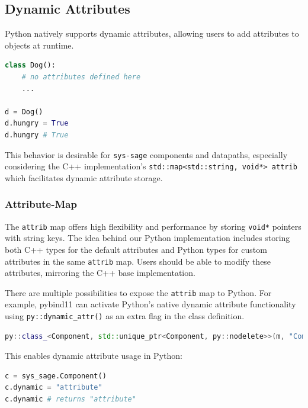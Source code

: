 \subsection{Dynamic Attributes}

Python natively supports dynamic attributes, allowing users to add attributes to objects at runtime.

\begin{lstlisting}[language=Python, xleftmargin=4em, frame = single]
class Dog():
    # no attributes defined here
    ...

d = Dog()
d.hungry = True
d.hungry # True
\end{lstlisting}

This behavior is desirable for \verb|sys-sage| components and datapaths, especially considering the C++ implementation's \verb|std::map<std::string, void*> attrib| which facilitates dynamic attribute storage.

\subsubsection{Attribute-Map}

The \verb|attrib| map offers high flexibility and performance by storing \verb|void*| pointers with string keys. The idea behind our Python implementation includes storing both C++ types for the default attributes and Python types for custom attributes in the same \verb|attrib| map. Users should be able to modify these attributes, mirroring the C++ base implementation.

There are multiple possibilities to expose the \verb|attrib| map to Python. For example, pybind11 can activate Python's native dynamic attribute functionality using \verb|py::dynamic_attr()| as an extra flag in the class definition.\cite{pybind11-docu}

\begin{lstlisting}[language=C++, xleftmargin=4em, frame = single]
py::class_<Component, std::unique_ptr<Component, py::nodelete>>(m, "Component", py::dynamic_attr(),"Generic Component");
\end{lstlisting}

This enables dynamic attribute usage in Python:

\begin{lstlisting}[language=Python, xleftmargin=4em, frame = single]
c = sys_sage.Component()
c.dynamic = "attribute"
c.dynamic # returns "attribute"
\end{lstlisting}

